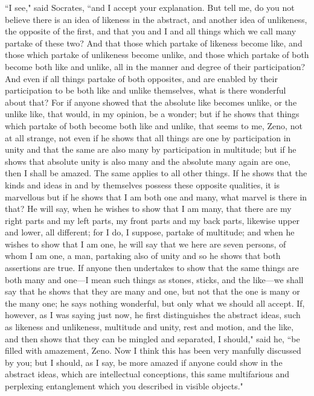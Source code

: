 \documentclass[letterpaper,12pt]{article}
\newcommand{\stephpag}[1]{\marginnote{\small\itshape\fontfamily{ppl}\selectfont #1}}
\begin{document}
``I see," said Socrates, ``and I accept your explanation. But tell me, do you not believe there is an idea of likeness in the abstract, \stephpag{129 a} and another idea of unlikeness, the opposite of the first, and that you and I and all things which we call many partake of these two? And that those which partake of likeness become like, and those which partake of unlikeness become unlike, and those which partake of both become both like and unlike, all in the manner and degree of their participation? And even if all things partake of both opposites, and are enabled by their participation to be both like and unlike themselves, \stephpag{b} what is there wonderful about that? For if anyone showed that the absolute like becomes unlike, or the unlike like, that would, in my opinion, be a wonder; but if he shows that things which partake of both become both like and unlike, that seems to me, Zeno, not at all strange, not even if he shows that all things are one by participation in unity and that the same are also many by participation in multitude; but if he shows that absolute unity is also many and the absolute many again are one, then I shall be amazed. \stephpag{c} The same applies to all other things. If he shows that the kinds and ideas in and by themselves possess these opposite qualities, it is marvellous but if he shows that I am both one and many, what marvel is there in that? He will say, when he wishes to show that I am many, that there are my right parts and my left parts, my front parts and my back parts, likewise upper and lower, all different; for I do, I suppose, partake of multitude; \stephpag{d} and when he wishes to show that I am one, he will say that we here are seven persons, of whom I am one, a man, partaking also of unity and so he shows that both assertions are true. If anyone then undertakes to show that the same things are both many and one—I mean such things as stones, sticks, and the like—we shall say that he shows that they are many and one, but not that the one is many or the many one; he says nothing wonderful, but only what we should all accept. If, however, as I was saying just now, he first distinguishes the abstract ideas, such as likeness and unlikeness, \stephpag{e} multitude and unity, rest and motion, and the like, and then shows that they can be mingled and separated, I should," said he, ``be filled with amazement, Zeno. Now I think this has been very manfully discussed by you; but I should, as I say, be more amazed if anyone could show in the abstract ideas, which are intellectual conceptions, \stephpag{130 a} this same multifarious and perplexing entanglement which you described in visible objects."
\end{document}

